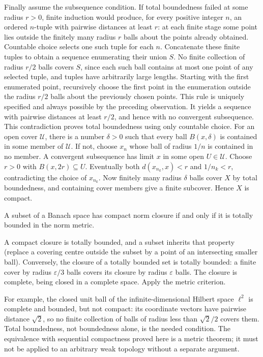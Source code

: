 Finally assume the subsequence condition. If total boundedness failed
at some radius $r>0$, finite induction would produce, for every positive
integer $n$, an ordered $n$-tuple with pairwise distances at least $r$:
at each finite stage some point lies outside the finitely many radius
$r$ balls about the points already obtained. Countable choice selects
one such tuple for each $n$. Concatenate these finite tuples to obtain
a sequence enumerating their union $S$. No finite collection of radius
$r/2$ balls covers $S$, since each such ball contains at most one point
of any selected tuple, and tuples have arbitrarily large lengths.
Starting with the first enumerated point, recursively choose the first
point in the enumeration outside the radius $r/2$ balls about the
previously chosen points. This rule is uniquely specified and always
possible by the preceding observation. It yields a sequence with pairwise
distances at least $r/2$, and hence with no convergent subsequence.
This contradiction proves total boundedness using only countable choice.
For an open cover $\mathcal U$, there is a number $\delta>0$ such
that every ball $B(x,\delta)$ is contained in some member of
$\mathcal U$. If not, choose $x_n$ whose ball of radius $1/n$ is
contained in no member. A convergent subsequence has limit $x$ in
some open $U\in\mathcal U$. Choose $r>0$ with $B(x,2r)\subseteq U$.
Eventually both $d(x_{n_k},x)<r$ and $1/n_k<r$, contradicting the
choice of $x_{n_k}$. Now finitely many radius $\delta$ balls cover
$X$ by total boundedness, and containing cover members give a finite
subcover. Hence $X$ is compact.
\Done

\begin{corollary}
A subset of a Banach space has compact norm closure if and only if it
is totally bounded in the norm metric.
\end{corollary}
\Proof
A compact closure is totally bounded, and a subset inherits that
property (replace a covering centre outside the subset by a point of
an intersecting smaller ball). Conversely, the closure of a totally
bounded set is totally bounded: a finite cover by radius
$\varepsilon/3$ balls covers its closure by radius $\varepsilon$ balls.
The closure is complete, being closed in a complete space. Apply the
metric criterion.
\Done

For example, the closed unit ball of the infinite-dimensional Hilbert
space $\ell^2$ is complete and bounded, but not compact: its coordinate
vectors have pairwise distance $\sqrt2$, so no finite collection of
balls of radius less than $\sqrt2/2$ covers them. Total boundedness,
not boundedness alone, is the needed condition. The equivalence with
sequential compactness proved here is a metric theorem; it must not be
applied to an arbitrary weak topology without a separate argument.


